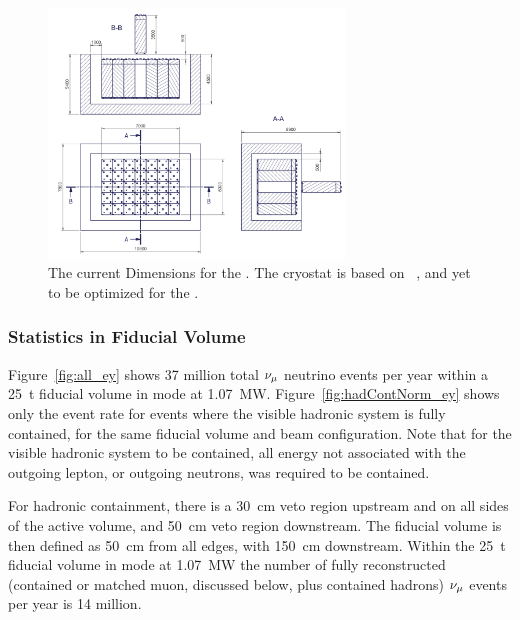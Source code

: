 \begin{figure}[tbp]
	\centering
	\includegraphics[width=0.7\textwidth]{graphics/actual-size.png}
	\caption{The current  Dimensions for the   . The cryostat is based on ~\cite{Abi:2017aow}, and yet to be optimized for the   .}
	\label{fig:actual-size}
\end{figure}


\subsubsection{Statistics in Fiducial Volume}\label{sec:rates}

Figure~\ref{fig:all_ey} shows 37 million total  $\nu_\mu$ neutrino events per year within a \SI{25}{\tonne} fiducial volume in  mode at \SI{1.07}{\mega\watt}. Figure~\ref{fig:hadContNorm_ey} shows only the event rate for events where the visible hadronic system is fully contained, for the same fiducial volume and beam configuration. Note that for the visible hadronic system to be contained, all energy not associated with the outgoing lepton, or outgoing neutrons, was required to be contained. 


For hadronic containment, there is a \SI{30}{\centi\metre} veto region upstream and on all sides of the active volume, and \SI{50}{\centi\metre} veto region downstream. The fiducial volume is then defined as \SI{50}{\centi\metre} from all edges, with \SI{150}{\centi\metre} downstream.  Within the \SI{25}{\tonne} fiducial volume in  mode at \SI{1.07}{\mega\watt} the number of fully reconstructed (contained or matched muon, discussed below, plus contained hadrons)  $\nu_\mu$ events per year is 14 million.   

